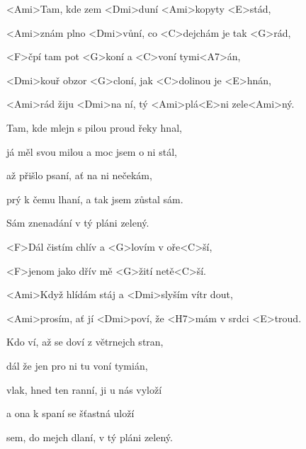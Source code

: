 

\zs
<Ami>Tam, kde zem <Dmi>duní <Ami>kopyty <E>stád,

<Ami>znám plno <Dmi>vůní, co <C>dejchám je tak <G>rád,

<F>čpí tam pot <G>koní a <C>voní tymi<A7>án,

<Dmi>kouř obzor <G>cloní, jak <C>dolinou je <E>hnán,

<Ami>rád žiju <Dmi>na ní, tý <Ami>plá<E>ni zele<Ami>ný.
\ks

\zs
Tam, kde mlejn s pilou proud řeky hnal,

já měl svou milou a moc jsem o ni stál,

až přišlo psaní, ať na ni nečekám,

prý k čemu lhaní, a tak jsem zůstal sám.

Sám znenadání v tý pláni zelený.
\ks

\zr
<F>Dál čistím chlív a <G>lovím v oře<C>ší,

<F>jenom jako dřív mě <G>žití netě<C>ší.

<Ami>Když hlídám stáj a <Dmi>slyším vítr dout,

<Ami>prosím, ať jí <Dmi>poví, že <H7>mám v srdci <E>troud.
\kr

\zs
Kdo ví, až se doví z větrnejch stran,

dál že jen pro ni tu voní tymián,

vlak, hned ten ranní, ji u nás vyloží

a ona k spaní se šťastná uloží

sem, do mejch dlaní, v tý pláni zelený.
\ks

\kp
